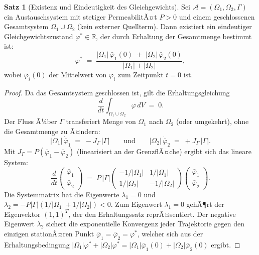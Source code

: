 ﻿\documentclass[a4paper,12pt]{article}
\theoremstyle{definition}
\newtheorem{satz}{Satz}
\begin{document}
\begin{satz}[Existenz und Eindeutigkeit des Gleichgewichts]
    Sei $\mathcal{A} = (\Omega_1, \Omega_2, \Gamma)$ ein Austauschsystem mit
    stetiger PermeabilitÃ¤t $P > 0$ und einem geschlossenen Gesamtsystem
    $\Omega_1 \cup \Omega_2$ (kein externer Quellterm). Dann existiert ein
    eindeutiger Gleichgewichtszustand $\varphi^* \in \mathbb{R}$, der durch
    Erhaltung der Gesamtmenge bestimmt ist:
    \[
        \varphi^* \;=\; \frac{|\Omega_1|\,\bar\varphi_1(0) \;+\; |\Omega_2|\,\bar\varphi_2(0)}{|\Omega_1| + |\Omega_2|},
    \]
    wobei $\bar\varphi_i(0)$ der Mittelwert von $\varphi_i$ zum Zeitpunkt $t=0$ ist.
\end{satz}

\begin{proof}
    Da das Gesamtsystem geschlossen ist, gilt die Erhaltungsgleichung
    \[
        \frac{d}{dt}\int_{\Omega_1 \cup \Omega_2} \varphi \,dV \;=\; 0.
    \]
    Der Fluss Ã¼ber $\Gamma$ transferiert Menge von $\Omega_1$ nach $\Omega_2$
    (oder umgekehrt), ohne die Gesamtmenge zu Ã¤ndern:
    \[
        |\Omega_1|\,\dot{\bar\varphi}_1 \;=\; -J_\Gamma\,|\Gamma|
        \qquad \text{und} \qquad
        |\Omega_2|\,\dot{\bar\varphi}_2 \;=\; +J_\Gamma\,|\Gamma|.
    \]
    Mit $J_\Gamma = P(\bar\varphi_1 - \bar\varphi_2)$ (linearisiert an der GrenzflÃ¤che) ergibt sich
    das lineare System:
    \[
        \frac{d}{dt}\begin{pmatrix} \bar\varphi_1 \\ \bar\varphi_2 \end{pmatrix}
        \;=\; P\,|\Gamma|
        \begin{pmatrix} -1/|\Omega_1| & 1/|\Omega_1| \\ 1/|\Omega_2| & -1/|\Omega_2| \end{pmatrix}
        \begin{pmatrix} \bar\varphi_1 \\ \bar\varphi_2 \end{pmatrix}.
    \]
    Die Systemmatrix hat die Eigenwerte $\lambda_1 = 0$ und
    $\lambda_2 = -P|\Gamma|(1/|\Omega_1| + 1/|\Omega_2|) < 0$.
    Zum Eigenwert $\lambda_1 = 0$ gehÃ¶rt der Eigenvektor $(1,1)^T$, der den
    Erhaltungssatz reprÃ¤sentiert. Der negative Eigenwert $\lambda_2$ sichert
    die exponentielle Konvergenz jeder Trajektorie gegen den einzigen
    stationÃ¤ren Punkt $\bar\varphi_1 = \bar\varphi_2 = \varphi^*$,
    welcher sich aus der Erhaltungsbedingung
    $|\Omega_1|\varphi^* + |\Omega_2|\varphi^* = |\Omega_1|\bar\varphi_1(0) + |\Omega_2|\bar\varphi_2(0)$
    ergibt. \qedhere
\end{proof}
\end{document}
